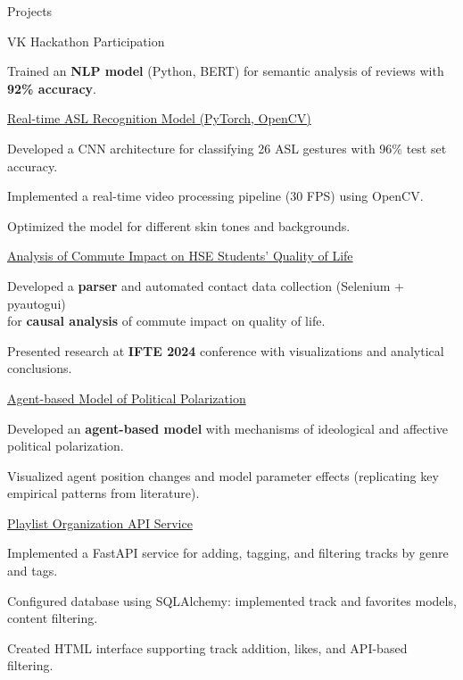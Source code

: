 \documentclass[10pt]{resume} %
\begin{document}
\begin{rSection}{Projects}

\begin{rSubsection}{VK Hackathon Participation}{}{}{}
    \item Trained an \textbf{NLP model} (Python, BERT) for semantic analysis of reviews with \textbf{92\% accuracy}.
\end{rSubsection}

\begin{rSubsection}{\href{https://github.com/mrariv/asl_recognition}{Real-time ASL Recognition Model (PyTorch, OpenCV)}}{}{}{}
    \item Developed a CNN architecture for classifying 26 ASL gestures with 96\% test set accuracy.
    \item Implemented a real-time video processing pipeline (30 FPS) using OpenCV.
    \item Optimized the model for different skin tones and backgrounds.
\end{rSubsection}

\begin{rSubsection}{\href{https://github.com/mrariv/commute_project}{Analysis of Commute Impact on HSE Students' Quality of Life}}{}{}{}
    \item Developed a \textbf{parser} and automated contact data collection (Selenium + pyautogui) \\ for \textbf{causal analysis} of commute impact on quality of life.
    \item Presented research at \textbf{IFTE 2024} conference with visualizations and analytical conclusions.
\end{rSubsection}

\begin{rSubsection}{\href{https://github.com/mrariv/model_polarization}{Agent-based Model of Political Polarization}}{}{}{}
    \item Developed an \textbf{agent-based model} with mechanisms of ideological and affective political polarization.
    \item Visualized agent position changes and model parameter effects (replicating key empirical patterns from literature).
\end{rSubsection}

\begin{rSubsection}{\href{https://github.com/mrariv/playlist-manager}{Playlist Organization API Service}}{}{}{}
    \item Implemented a FastAPI service for adding, tagging, and filtering tracks by genre and tags.
    \item Configured database using SQLAlchemy: implemented track and favorites models, content filtering.
    \item Created HTML interface supporting track addition, likes, and API-based filtering.
\end{rSubsection}

\end{rSection}
\end{document}
